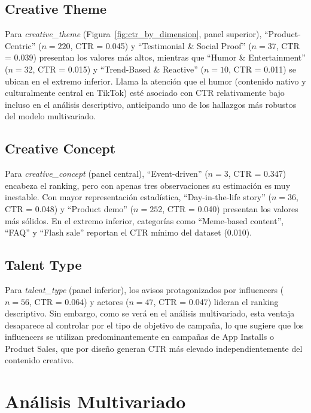 \documentclass[12pt, a4paper]{report}
\begin{document}
\subsection{Creative Theme}

Para \textit{creative\_theme} (Figura~\ref{fig:ctr_by_dimension}, panel
superior), ``Product-Centric'' ($n = 220$, CTR = 0.045) y ``Testimonial
\& Social Proof'' ($n = 37$, CTR = 0.039) presentan los valores más
altos, mientras que ``Humor \& Entertainment'' ($n = 32$, CTR = 0.015)
y ``Trend-Based \& Reactive'' ($n = 10$, CTR = 0.011) se ubican en el
extremo inferior. Llama la atención que el humor (contenido nativo y
culturalmente central en TikTok) esté asociado con CTR relativamente
bajo incluso en el análisis descriptivo, anticipando uno de los hallazgos
más robustos del modelo multivariado.

\subsection{Creative Concept}

Para \textit{creative\_concept} (panel central), ``Event-driven''
($n = 3$, CTR = 0.347) encabeza el ranking, pero con apenas tres
observaciones su estimación es muy inestable. Con mayor representación
estadística, ``Day-in-the-life story'' ($n = 36$, CTR = 0.048) y
``Product demo'' ($n = 252$, CTR = 0.040) presentan los valores más
sólidos. En el extremo inferior, categorías como ``Meme-based content'',
``FAQ'' y ``Flash sale'' reportan el CTR mínimo del dataset (0.010).

\subsection{Talent Type}

Para \textit{talent\_type} (panel inferior), los avisos protagonizados
por influencers ($n = 56$, CTR = 0.064) y actores ($n = 47$,
CTR = 0.047) lideran el ranking descriptivo. Sin embargo, como se verá
en el análisis multivariado, esta ventaja desaparece al controlar por el
tipo de objetivo de campaña, lo que sugiere que los influencers se
utilizan predominantemente en campañas de App Installs o Product Sales,
que por diseño generan CTR más elevado independientemente del contenido
creativo.

\section{Análisis Multivariado}
\end{document}
